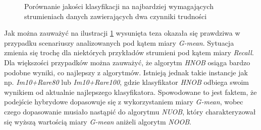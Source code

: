\begin{figure}[h]
    \centering
    \qquad
    \caption{Porównanie jakości klasyfikacji na najbardziej wymagających strumieniach danych zawierających dwa czynniki trudności}\label{Figure:PairsComparisonHNOB}
\end{figure}

\noindent Jak można zauważyć na ilustracji \ref{Figure:PairsComparisonHNOB} wysunięta teza okazała się prawdziwa w przypadku scenariuszy analizowanych pod kątem miary \textit{G-mean}. Sytuacja zmienia się trochę dla niektórych przykładów strumieni pod kątem miary \textit{Recall}. Dla większości przypadków można zauważyć, że algorytm \textit{HNOB} osiąga bardzo podobne wyniki, co najlepszy z algorytmów. Istnieją jednak takie instancje jak np. \textit{Im10+Rare80} lub \textit{Im10+Rare100}, gdzie klasyfikator \textit{HNOB} odbiega swoim wynikiem od aktualnie najlepszego klasyfikatora. Spowodowane to jest faktem, że podejście hybrydowe dopasowuje się z wykorzystaniem miary \textit{G-mean}, wobec czego dopasowanie musiało nastąpić do algorytmu \textit{NUOB}, który charakteryzował się wyższą wartością miary \textit{G-mean} aniżeli algorytm \textit{NOOB}.

